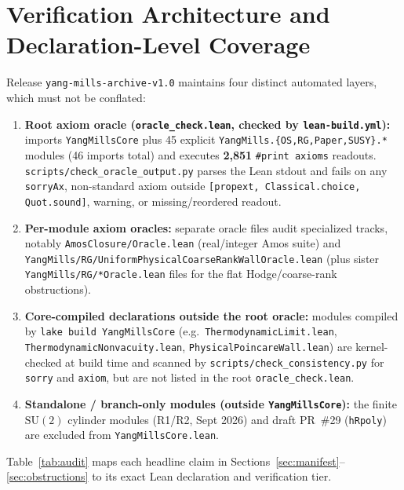 \documentclass[11pt]{article}
\begin{document}
\section{Verification Architecture and Declaration-Level Coverage}

Release \texttt{yang-mills-archive-v1.0} maintains four distinct automated layers, which
must not be conflated:
\begin{enumerate}
  \item \textbf{Root axiom oracle (\texttt{oracle\_check.lean}, checked by \texttt{lean-build.yml}):}
  imports \texttt{YangMillsCore} plus 45 explicit \texttt{YangMills.\{OS,RG,Paper,SUSY\}.*}
  modules (46 imports total) and executes \textbf{2,851} \texttt{\#print axioms} readouts.
  \texttt{scripts/check\_oracle\_output.py} parses the Lean stdout and fails on any
  \texttt{sorryAx}, non-standard axiom outside \texttt{[propext, Classical.choice, Quot.sound]},
  warning, or missing/reordered readout.
  \item \textbf{Per-module axiom oracles:} separate oracle files audit specialized tracks,
  notably \texttt{AmosClosure/Oracle.lean} (real/integer Amos suite) and
  \texttt{YangMills/RG/UniformPhysicalCoarseRankWallOracle.lean} (plus sister
  \texttt{YangMills/RG/*Oracle.lean} files for the flat Hodge/coarse-rank obstructions).
  \item \textbf{Core-compiled declarations outside the root oracle:} modules compiled by
  \texttt{lake build YangMillsCore} (e.g.\ \texttt{ThermodynamicLimit.lean},
  \texttt{ThermodynamicNonvacuity.lean}, \texttt{PhysicalPoincareWall.lean}) are kernel-checked
  at build time and scanned by \texttt{scripts/check\_consistency.py} for \texttt{sorry} and
  \texttt{axiom}, but are not listed in the root \texttt{oracle\_check.lean}.
  \item \textbf{Standalone / branch-only modules (outside \texttt{YangMillsCore}):} the
  finite $\mathrm{SU}(2)$ cylinder modules (R1/R2, Sept 2026) and draft PR~\#29
  (\texttt{hRpoly}) are excluded from \texttt{YangMillsCore.lean}.
\end{enumerate}

Table~\ref{tab:audit} maps each headline claim in Sections~\ref{sec:manifest}--\ref{sec:obstructions}
to its exact Lean declaration and verification tier.
\end{document}
